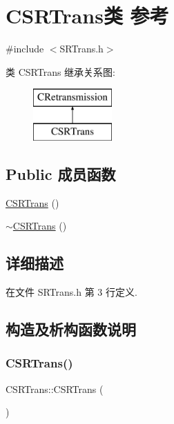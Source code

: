 \hypertarget{class_c_s_r_trans}{}\section{C\+S\+R\+Trans类 参考}
\label{class_c_s_r_trans}


{\ttfamily \#include $<$S\+R\+Trans.\+h$>$}

类 C\+S\+R\+Trans 继承关系图\+:\begin{figure}[H]
\begin{center}
\leavevmode
\includegraphics[height=2.000000cm]{class_c_s_r_trans}
\end{center}
\end{figure}
\subsection*{Public 成员函数}
\begin{DoxyCompactItemize}
\item 
\hyperlink{class_c_s_r_trans_ab13bd01789b3c571323d6848c80b3d07}{C\+S\+R\+Trans} ()
\item 
\hyperlink{class_c_s_r_trans_a6ead60de09d2a377c5527da55c7ec484}{$\sim$\+C\+S\+R\+Trans} ()
\end{DoxyCompactItemize}


\subsection{详细描述}


在文件 S\+R\+Trans.\+h 第 3 行定义.



\subsection{构造及析构函数说明}
\mbox{\label{class_c_s_r_trans_ab13bd01789b3c571323d6848c80b3d07}} 
\subsubsection{\texorpdfstring{C\+S\+R\+Trans()}{CSRTrans()}}
{\footnotesize\ttfamily C\+S\+R\+Trans\+::\+C\+S\+R\+Trans (\begin{DoxyParamCaption}{ }\end{DoxyParamCaption})}



